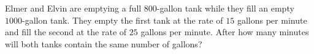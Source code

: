 Elmer and Elvin are emptying a full $800$-gallon tank while they fill an empty $1000$-gallon tank. They empty the first tank at the rate of $15$ gallons per minute and fill the second at the rate of $25$ gallons per minute. After how many minutes will both tanks contain the same number of gallons?
